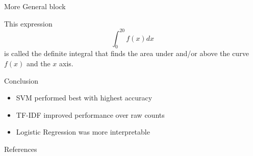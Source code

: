 \documentclass{beamer}
\newlength{\colwidth}
\begin{document}
\begin{frame}[t]
\begin{columns}[t]
\begin{column}{\colwidth}
\begin{exampleblock}{More General block}
\begin{center}
        \end{center}
        This expression
        \begin{equation*}
            \int_0^{20} f(x)dx   
        \end{equation*}
        is called the definite integral that finds the area under and/or above the curve $f(x)$ and the $x$ axis.
\end{exampleblock}

\begin{exampleblock}{Conclusion}
\begin{itemize}
  \item SVM performed best with highest accuracy
  \item TF-IDF improved performance over raw counts
  \item Logistic Regression was more interpretable
\end{itemize}
\end{exampleblock}

\begin{block}{References}
\small
\footnotesize{}
\end{block}
\end{column}

\end{columns}
\end{frame}
\end{document}
